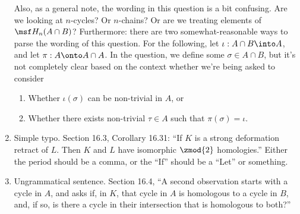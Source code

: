 \documentclass{fkletter}
\begin{document}
\begin{enumerate}
    Also, as a general note, the wording in this question is a bit confusing.
    Are we looking at $n$-cycles? Or $n$-chains? Or are we treating elements of
    $\msf H_n(A\cap B)$? Furthermore: there are two somewhat-reasonable ways to
    parse the wording of this question. For the following, let $\iota : A\cap B
    \into A$, and let $\pi : A \onto A \cap A$. In the question, we define some
    $\sigma \in A \cap B$, but it's not completely clear based on the context
    whether we're being asked to consider
    \begin{enumerate}[label=(\arabic*)]
      \item Whether $\iota(\sigma)$ can be non-trivial in $A$, or
      \item Whether there exists non-trivial $\tau \in A$ such that
        $\pi(\sigma) = \iota$.
    \end{enumerate}
  \item Simple typo. Section 16.3, Corollary 16.31: ``{\color{red}If } $K$ is a
    strong deformation retract of $L${\color{red}.} Then $K$ and $L$ have
    isomorphic $\zmod{2}$ homologies.'' Either the period should be a comma, or
    the ``If'' should be a ``Let'' or something.
  \item Ungrammatical sentence. Section 16.4, ``A second observation starts with
    a cycle in $A$, {\color{red} and asks if,} in $K$, that cycle in $A$ is
    homologous to a cycle in $B$, {\color{red} and, if so, is there} a cycle in
    their intersection that is homologous to both?''

  \end{enumerate}
\end{document}
